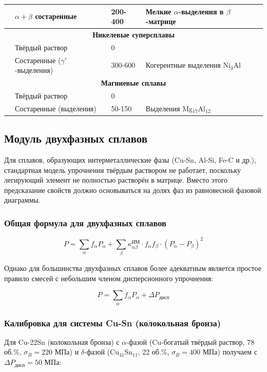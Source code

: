 \documentclass[12pt,a4paper]{article}
\begin{document}
\begin{longtable}{p{3.5cm}p{3.0cm}p{3.0cm}p{4cm}}
		& \(\alpha+\beta\) состаренные & 200-400 & Мелкие \(\alpha\)-выделения в \(\beta\)-матрице \\
		\hline
		\multicolumn{4}{c}{\textbf{Никелевые суперсплавы}} \\
		& Твёрдый раствор & 0 & \\
		& Состаренные (\(\gamma'\)-выделения) & 300-600 & Когерентные выделения Ni\(_3\)Al \\
		\hline
		\multicolumn{4}{c}{\textbf{Магниевые сплавы}} \\
		& Твёрдый раствор & 0 & \\
		& Состаренные (выделения) & 50-150 & Выделения Mg\(_{17}\)Al\(_{12}\) \\
		\bottomrule
	\end{longtable}
	
	\subsection{Модуль двухфазных сплавов}
	\label{subsec:two-phase-alloys}
	
	Для сплавов, образующих интерметаллические фазы (Cu-Sn, Al-Si, Fe-C и др.), стандартная модель упрочнения твёрдым раствором не работает, поскольку легирующий элемент не полностью растворён в матрице. Вместо этого предсказание свойств должно основываться на долях фаз из равновесной фазовой диаграммы.
	
	\subsubsection{Общая формула для двухфазных сплавов}
	
	\begin{equation}
		\boxed{P = \sum_{\alpha} f_{\alpha} P_{\alpha} + \sum_{\beta} \kappa_{\alpha\beta}^{\text{ИМ}} \cdot f_{\alpha} f_{\beta} \cdot (P_{\alpha} - P_{\beta})^2}
		\label{eq:two-phase-alloy}
	\end{equation}
	
	Однако для большинства двухфазных сплавов более адекватным является простое правило смесей с небольшим членом дисперсионного упрочнения:
	
	\begin{equation}
		\boxed{P = \sum_{\alpha} f_{\alpha} P_{\alpha} + \Delta P_{\text{дисп}}}
		\label{eq:two-phase-simple}
	\end{equation}
	
	\subsubsection{Калибровка для системы Cu-Sn (колокольная бронза)}
	Для Cu-22Sn (колокольная бронза) с \(\alpha\)-фазой (Cu-богатый твёрдый раствор, 78 об.\%, \(\sigma_B=220\) МПа) и \(\delta\)-фазой (Cu\(_{41}\)Sn\(_{11}\), 22 об.\%, \(\sigma_B=400\) МПа) получаем с \(\Delta P_{\text{дисп}}=50\) МПа:
	
\end{document}
